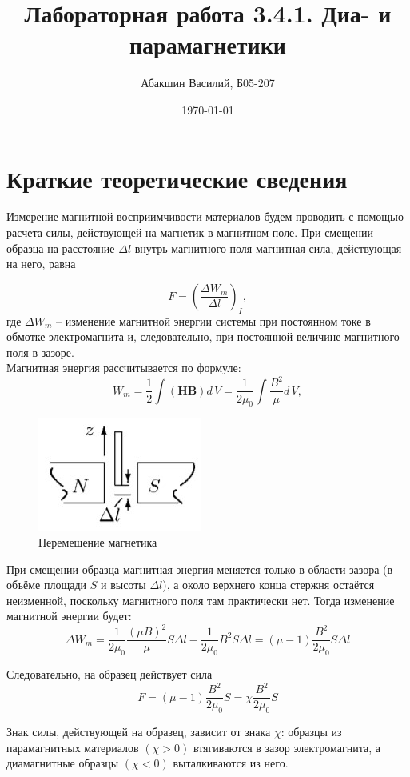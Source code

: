 \documentclass[a4paper, 12pt]{article}
\date{\today}
\author{Абакшин Василий, Б05-207}
\title{Лабораторная работа 3.4.1. Диа- и парамагнетики}
\begin{document}
	\maketitle
	\section*{Краткие теоретические сведения}
	Измерение магнитной восприимчивости материалов будем проводить с помощью расчета силы, действующей на магнетик в магнитном поле. При смещении образца на расстояние $ \Delta l $ внутрь магнитного поля магнитная сила, действующая на него, равна
	
	\begin{equation}
		F = \left(\frac{\Delta W_m}{\Delta l}\right)_I,
	\end{equation}
	где $ \Delta W_m $ -- изменение магнитной энергии системы при постоянном токе
	в обмотке электромагнита и, следовательно, при постоянной величине
	магнитного поля в зазоре.\\
	Магнитная энергия рассчитывается по формуле:
	\[W_m=\frac{1}{2}\int (\mathbf{H}\mathbf{B})d\,V = \frac{1}{2\mu_0}\int\frac{B^2}{\mu}d\,V,\]
	\begin{figure}
		\centering
		\includegraphics[height = 0.12\textheight]{energy}
		\caption{Перемещение магнетика}
	\end{figure}
	

	 При смещении образца магнитная энергия меняется только в области зазора (в объёме площади $ S $ и высоты $ \Delta l $), а около верхнего конца стержня остаётся неизменной, поскольку магнитного поля там практически нет. Тогда изменение магнитной энергии будет:
	\[\Delta W_m=\frac{1}{2\mu_0}\frac{(\mu B)^2}{\mu}S\Delta l - \frac{1}{2\mu_0}B^2 S\Delta l = (\mu - 1) \frac{B^2}{2\mu_0}S\Delta l \]
	
	Следовательно, на образец действует сила
	\[F = (\mu - 1)\frac{B^2}{2\mu_0}S = \chi\frac{B^2}{2\mu_0}S\]
	
	Знак силы, действующей на образец, зависит от знака $ \chi $: образцы из парамагнитных материалов $( \chi  > 0)$ втягиваются в зазор электромагнита, а диамагнитные образцы $ (\chi < 0) $ выталкиваются из него.
	
\end{document}
